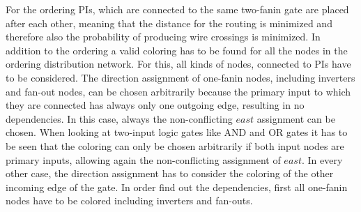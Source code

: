 For the ordering PIs, which are connected to the same two-fanin gate are placed after each other, meaning that the distance for the routing is minimized and therefore also the probability of producing wire crossings is minimized. In addition to the ordering a valid coloring has to be found for all the nodes in the ordering distribution network. For this, all kinds of nodes, connected to PIs have to be considered.
The direction assignment of one-fanin nodes, including inverters and fan-out nodes, can be chosen arbitrarily because the primary input to which they are connected has always only one outgoing edge, resulting in no dependencies. In this case, always the non-conflicting $east$ assignment can be chosen. When looking at two-input logic gates like AND and OR gates it has to be seen that the coloring can only be chosen arbitrarily if both input nodes are primary inputs, allowing again the non-conflicting assignment of $east$. In every other case, the direction assignment has to consider the coloring of the other incoming edge of the gate. In order find out the dependencies, first all one-fanin nodes have to be colored including inverters and fan-outs.

